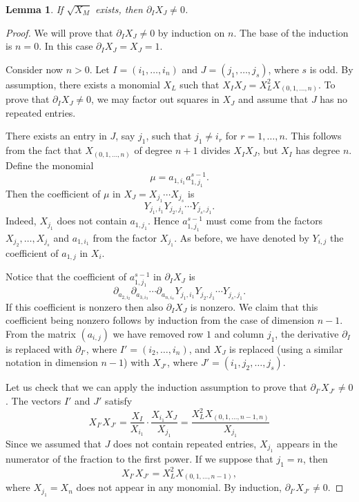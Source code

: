 \documentclass[10pt]{article}
\newtheorem{lemma}[theorem]{Lemma}
\theoremstyle{definition}
\renewcommand{\a}[1]{a_{#1}}
\begin{document}
\begin{lemma}
If $\sqrt{X_M}$ exists, then $\partial_I X_J \neq 0$.
\end{lemma}

\begin{proof}
We will prove that $\partial_I X_J \neq 0$ by induction on $n$. 
The base of the induction is $n=0$. In this case $\partial_I X_J = X_J =1$.

Consider now $n>0$.  Let $I=(i_1,\ldots, i_n)$ and $J=(j_1,\ldots,j_s)$, where $s$ is odd. By assumption, there exists a monomial $X_L$ such that $X_I X_J = X_L^2 X_{(0,1,\ldots,n)}$.  To prove that $\partial_I X_J \neq 0$, we may factor out squares in $X_J$ and assume that $J$ has no repeated entries.

There exists an entry in $J$, say $j_1$, such that $j_1 \neq i_r$ for $r=1,\ldots, n$. This follows from the fact that $X_{(0,1,\ldots,n)}$ of degree $n+1$ divides $X_I X_J$, but $X_I$ has degree $n$. Define the monomial  
  \[ \mu = \a{1,i_1} \a{1,j_1}^{s-1}.\]
Then the coefficient of $\mu$ in $X_J=X_{j_1} \cdots X_{j_s}$ is 
\[  Y_{j_1, i_1} Y_{j_2, j_1} \cdots Y_{j_s,j_1}.\]
Indeed, $X_{j_1}$ does not contain $\a{1,j_1}$. Hence $\a{1,j_1}^{s-1}$ must come from the factors $X_{j_2}, \ldots, X_{j_s}$  and $\a{1,i_1}$ from the factor $X_{j_1}$. As before, we have denoted by $Y_{i,j}$ the coefficient of $\a{1,j}$ in $X_i$.

Notice that the coefficient of $\a{1,j_1}^{s-1}$ in $\partial_I X_J$ is 
\[ \partial_{\a{2,i_2}} \partial_{\a{3,i_3}} \cdots \partial_{\a{n,i_n}} Y_{j_1, i_1} Y_{j_2, j_1} \cdots Y_{j_s,j_1}.\]
If this coefficient is nonzero then also $\partial_I X_J$ is nonzero. We claim that this coefficient being nonzero follows by induction from the case of dimension $n-1$.  From the matrix $(\a{i,j})$ we have removed row $1$ and column $j_1$, the derivative $\partial_I$ is replaced with $\partial_{I'}$, where $I' = (i_2,\ldots, i_n)$, and $X_J$ is replaced (using a similar notation in dimension $n-1$) with $X_{J'}$, where $J'=(i_1, j_2, \ldots, j_s)$. 

Let us check that we can apply the induction assumption to prove that $\partial_{I'} X_{J'} \neq 0$. The vectors $I'$ and $J'$ satisfy
\[ X_{I'} X_{J'} = \frac{X_I}{X_{i_1}} \cdot \frac{ X_{i_1} X_J }{ X_{j_1} } = \frac{X_L^2 X_{(0,1,\dots,n-1,n)}}{X_{j_1}}  \]
Since we assumed that $J$ does not contain repeated entries, $X_{j_1}$ appears in the numerator of the fraction to the first power. If we suppose that $j_1 = n$, then
\[ X_{I'} X_{J'} = X_L^2 X_{(0,1,\dots, n-1)}, \]
where $X_{j_1} = X_n$ does not appear in any monomial. By induction, $\partial_{I'} X_{J'} \neq 0$.
\end{proof}
\end{document}
